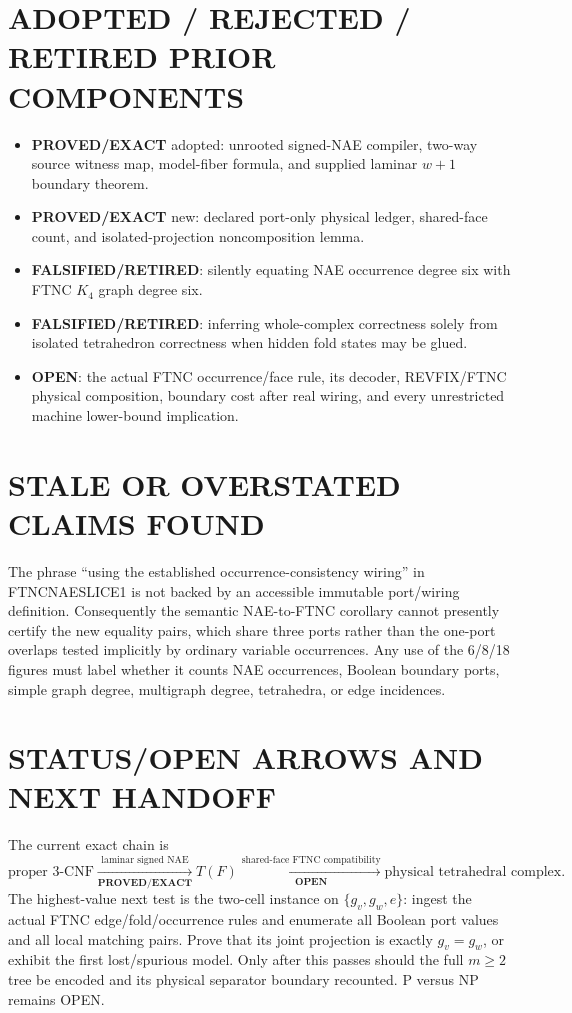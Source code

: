 \documentclass[11pt]{article}
\newcommand{\EXACT}{\textbf{PROVED/EXACT}}
\newcommand{\OPEN}{\textbf{OPEN}}
\newcommand{\RET}{\textbf{FALSIFIED/RETIRED}}
\begin{document}
\section{ADOPTED / REJECTED / RETIRED PRIOR COMPONENTS}
\begin{itemize}
\item \EXACT{} adopted: unrooted signed-NAE compiler, two-way source witness
map, model-fiber formula, and supplied laminar $w+1$ boundary theorem.
\item \EXACT{} new: declared port-only physical ledger, shared-face count, and
isolated-projection noncomposition lemma.
\item \RET{}: silently equating NAE occurrence degree six with FTNC $K_4$
graph degree six.
\item \RET{}: inferring whole-complex correctness solely from isolated
tetrahedron correctness when hidden fold states may be glued.
\item \OPEN{}: the actual FTNC occurrence/face rule, its decoder, REVFIX/FTNC
physical composition, boundary cost after real wiring, and every unrestricted
machine lower-bound implication.
\end{itemize}

\section{STALE OR OVERSTATED CLAIMS FOUND}
The phrase ``using the established occurrence-consistency wiring'' in
FTNCNAESLICE1 is not backed by an accessible immutable port/wiring definition.
Consequently the semantic NAE-to-FTNC corollary cannot presently certify the
new equality pairs, which share three ports rather than the one-port overlaps
tested implicitly by ordinary variable occurrences.  Any use of the 6/8/18
figures must label whether it counts NAE occurrences, Boolean boundary ports,
simple graph degree, multigraph degree, tetrahedra, or edge incidences.

\section{STATUS/OPEN ARROWS AND NEXT HANDOFF}
The current exact chain is
\[
\text{proper 3-CNF}
\xrightarrow[\EXACT]{\text{laminar signed NAE}}
T(F)
\xrightarrow[\OPEN]{\text{shared-face FTNC compatibility}}
\text{physical tetrahedral complex}.
\]
The highest-value next test is the two-cell instance on
$\{g_v,g_w,e\}$: ingest the actual FTNC edge/fold/occurrence rules and enumerate
all Boolean port values and all local matching pairs.  Prove that its joint
projection is exactly $g_v=g_w$, or exhibit the first lost/spurious model.
Only after this passes should the full $m\ge2$ tree be encoded and its physical
separator boundary recounted.  P versus NP remains OPEN.
\end{document}
